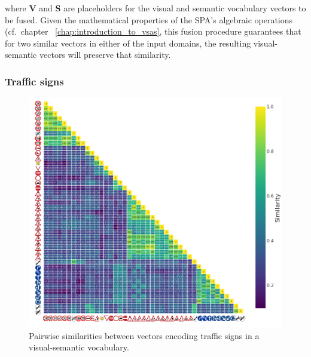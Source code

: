 where \textbf{V} and \textbf{S} are placeholders for the visual and semantic vocabulary vectors to be fused.
Given the mathematical properties of the \ac{SPA}'s algebraic operations (cf.\ chapter ~\ref{chap:introduction_to_vsas}, this fusion procedure guarantees that for two similar vectors in either of the input domains, the resulting visual-semantic vectors will preserve that similarity.

\subsubsection{Traffic signs}%
\label{ssubsec:traffic_signs}

\begin{figure}[t]
    \centering
    \includegraphics[width=0.8\linewidth]{imgs/visual_semantic_vocab_traffic_signs_internal_similarities.png}
    \caption{Pairwise similarities between vectors encoding traffic signs in a visual-semantic vocabulary.}
    \label{fig:visual_semantic_vocab_traffic_signs_internal_similarities}
\end{figure}

